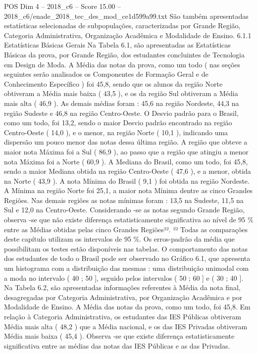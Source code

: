 \begin{textsample}{POS Dim 4 – 2018\_c6 – Score 15.00 – 2018\_c6/enade\_2018\_tec\_des\_mod\_ce1d599a99.txt}
São também apresentadas estatísticas selecionadas de subpopulações, caracterizadas por Grande Região, Categoria Administrativa, Organização Acadêmica e Modalidade de Ensino. 6.1.1 Estatísticas Básicas Gerais Na Tabela 6.1, são apresentadas as Estatísticas Básicas da prova, por Grande Região, dos estudantes concluintes de Tecnologia em Design de Moda.
A Média das notas da prova, como um todo ( nas seções seguintes serão analisados os Componentes de Formação Geral e de Conhecimento Específico ) foi 45,8, sendo que os alunos da região Norte obtiveram a Média mais baixa ( 43,5 ), e os da região Sul obtiveram a Média mais alta ( 46,9 ).
As demais médias foram : 45,6 na região Nordeste, 44,3 na região Sudeste e 46,8 na região Centro-Oeste.
O Desvio padrão para o Brasil, como um todo, foi 13,2, sendo o maior Desvio padrão encontrado na região Centro-Oeste ( 14,0 ), e o menor, na região Norte ( 10,1 ), indicando uma dispersão um pouco menor das notas dessa última região.
A região que obteve a maior nota Máxima foi a Sul ( 86,9 ), ao passo que a região que atingiu a menor nota Máxima foi a Norte ( 60,9 ).
A Mediana do Brasil, como um todo, foi 45,8, sendo a maior Mediana obtida na região Centro-Oeste ( 47,6 ), e a menor, obtida na Norte ( 43,9 ).
A nota Mínima do Brasil ( 9,1 ) foi obtida na região Nordeste.
A Mínima na região Norte foi 25,1, a maior nota Mínima dentre as cinco Grandes Regiões.
Nas demais regiões as notas mínimas foram : 13,5 na Sudeste, 11,5 na Sul e 12,0 na Centro-Oeste.
Considerando -se as notas segundo Grande Região, observa -se que não existe diferença estatisticamente significativa ao nível de 95 \% entre as Médias obtidas pelas cinco Grandes Regiões²². ²² Todas as comparações deste capítulo utilizam os intervalos de 95 \%.
Os erros-padrão da média que possibilitam os testes estão disponíveis nas tabelas.
O comportamento das notas dos estudantes de todo o Brasil pode ser observado no Gráfico 6.1, que apresenta um histograma com a distribuição das mesmas : uma distribuição unimodal com a moda no intervalo ( 40 ; 50 ], seguido pelos intervalos ( 50 ; 60 ] e ( 30 ; 40 ].
Na Tabela 6.2, são apresentadas informações referentes à Média da nota final, desagregadas por Categoria Administrativa, por Organização Acadêmica e por Modalidade de Ensino.
A Média das notas da prova, como um todo, foi 45,8.
Em relação à Categoria Administrativa, os estudantes das IES Públicas obtiveram Média mais alta ( 48,2 ) que a Média nacional, e os das IES Privadas obtiveram Média mais baixa ( 45,4 ).
Observa -se que existe diferença estatisticamente significativa entre as médias das notas das IES Públicas e as das Privadas.

\end{textsample}
